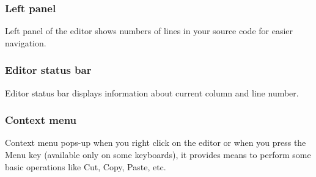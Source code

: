         \subsubsection{Left panel}
            Left panel of the editor shows numbers of lines in your source code for easier navigation.

        \subsubsection{Editor status bar}
            Editor status bar displays information about current column and line number.

        \subsubsection{Context menu}
            Context menu pops-up when you right click on the editor or when you press the Menu key (available only on some keyboards), it provides means to perform some basic operations like Cut, Copy, Paste, etc.

